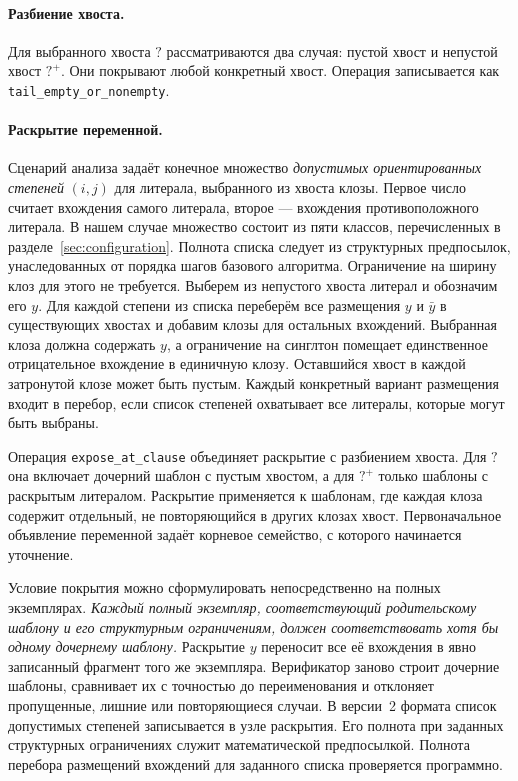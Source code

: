 \documentclass[10pt,twoside]{article}
\newcommand{\anytail}{\mathord{?}}
\newcommand{\plustail}{\mathord{?}^{+}}
\theoremstyle{definition}
\theoremstyle{remark}
\begin{document}
\paragraph{Разбиение хвоста.}
Для выбранного хвоста $\anytail$ рассматриваются два случая: пустой
хвост и непустой хвост $\plustail$. Они покрывают любой конкретный
хвост. Операция записывается как \texttt{tail\_empty\_or\_nonempty}.

\paragraph{Раскрытие переменной.}
Сценарий анализа задаёт конечное множество \emph{допустимых
ориентированных степеней} $(i,j)$ для литерала, выбранного из хвоста
клозы. Первое число считает вхождения самого литерала, второе ---
вхождения противоположного литерала. В нашем случае множество состоит
из пяти классов, перечисленных в разделе~\ref{sec:configuration}.
Полнота списка следует из структурных предпосылок, унаследованных от
порядка шагов базового алгоритма. Ограничение на ширину клоз для этого
не требуется.
Выберем из непустого хвоста литерал и обозначим его $y$. Для каждой
степени из списка переберём все размещения $y$ и $\bar y$ в
существующих хвостах и добавим клозы для остальных вхождений.
Выбранная клоза должна содержать $y$, а ограничение на синглтон
помещает единственное отрицательное вхождение в единичную клозу.
Оставшийся хвост в каждой затронутой клозе может быть пустым. Каждый
конкретный вариант размещения входит в перебор, если список степеней
охватывает все литералы, которые могут быть выбраны.

Операция \texttt{expose\_at\_clause} объединяет раскрытие с разбиением
хвоста. Для $\anytail$ она включает дочерний шаблон с пустым хвостом,
а для $\plustail$ только шаблоны с раскрытым литералом. Раскрытие
применяется к шаблонам, где каждая клоза содержит отдельный, не
повторяющийся в других клозах хвост. Первоначальное объявление
переменной задаёт корневое семейство, с которого начинается уточнение.

Условие покрытия можно сформулировать непосредственно на полных
экземплярах. \emph{Каждый полный экземпляр, соответствующий
родительскому шаблону и его структурным ограничениям, должен
соответствовать хотя бы одному дочернему шаблону.} Раскрытие $y$
переносит все её вхождения в явно записанный фрагмент того же
экземпляра. Верификатор заново строит дочерние шаблоны, сравнивает их
с точностью до переименования и отклоняет пропущенные, лишние или
повторяющиеся случаи. В версии~2 формата список допустимых степеней
записывается в узле раскрытия. Его полнота при заданных структурных
ограничениях служит математической предпосылкой. Полнота перебора
размещений вхождений для заданного списка проверяется программно.
\end{document}
